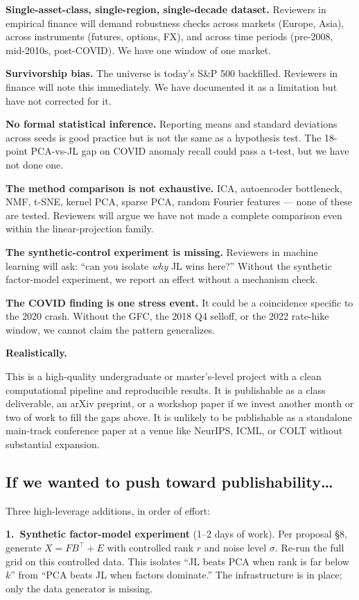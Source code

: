 \documentclass[11pt]{article}
\begin{document}
\textbf{Single-asset-class, single-region, single-decade dataset.} Reviewers in empirical finance will demand robustness checks across markets (Europe, Asia), across instruments (futures, options, FX), and across time periods (pre-2008, mid-2010s, post-COVID). We have one window of one market.

\textbf{Survivorship bias.} The universe is today's S\&P 500 backfilled. Reviewers in finance will note this immediately. We have documented it as a limitation but have not corrected for it.

\textbf{No formal statistical inference.} Reporting means and standard deviations across seeds is good practice but is not the same as a hypothesis test. The 18-point PCA-vs-JL gap on COVID anomaly recall could pass a t-test, but we have not done one.

\textbf{The method comparison is not exhaustive.} ICA, autoencoder bottleneck, NMF, t-SNE, kernel PCA, sparse PCA, random Fourier features --- none of these are tested. Reviewers will argue we have not made a complete comparison even within the linear-projection family.

\textbf{The synthetic-control experiment is missing.} Reviewers in machine learning will ask: ``can you isolate \emph{why} JL wins here?'' Without the synthetic factor-model experiment, we report an effect without a mechanism check.

\textbf{The COVID finding is one stress event.} It could be a coincidence specific to the 2020 crash. Without the GFC, the 2018 Q4 selloff, or the 2022 rate-hike window, we cannot claim the pattern generalizes.

\textbf{Realistically.}

This is a high-quality undergraduate or master's-level project with a clean computational pipeline and reproducible results. It is publishable as a class deliverable, an arXiv preprint, or a workshop paper if we invest another month or two of work to fill the gaps above. It is unlikely to be publishable as a standalone main-track conference paper at a venue like NeurIPS, ICML, or COLT without substantial expansion.

\subsection{If we wanted to push toward publishability\dots}

Three high-leverage additions, in order of effort:

\textbf{1.~Synthetic factor-model experiment} (1--2 days of work). Per proposal §8, generate $X = F B^\top + E$ with controlled rank $r$ and noise level $\sigma$. Re-run the full grid on this controlled data. This isolates ``JL beats PCA when rank is far below $k$'' from ``PCA beats JL when factors dominate.'' The infrastructure is in place; only the data generator is missing.
\end{document}
